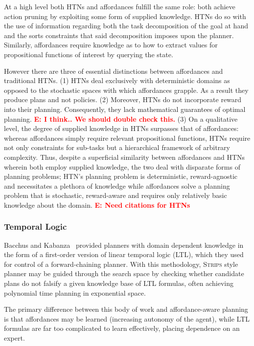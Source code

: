 \documentclass[conference]{IEEEtran}
\newcommand{\enote}[1]{\textcolor{Red}{\textbf{E: #1}}}
\begin{document}
At a high level both HTNs and affordances fulfill the same role: both achieve action pruning by exploiting some form of supplied knowledge. HTNs do so with the use of information regarding both the task decomposition of the goal at hand and the sorts constraints that said decomposition imposes upon the planner. Similarly, affordances require knowledge as to how to extract values for propositional functions of interest by querying the state.

However there are three of essential distinctions between affordances and traditional HTNs. (1) HTNs deal exclusively with deterministic domains as opposed to the stochastic spaces with which affordances grapple. As a result they produce plans and not policies. (2) Moreover, HTNs do not incorporate reward into their planning. Consequently, they lack mathematical guarantees of optimal planning. \enote{I think.. We should double check this.} (3) On a qualitative level, the degree of supplied knowledge in HTNs surpasses that of affordances: whereas affordances simply require relevant propositional functions, HTNs require not only constraints for sub-tasks but a hierarchical framework of arbitrary complexity. Thus, despite a superficial similarity between affordances and HTNs wherein both employ supplied knowledge, the two deal with disparate forms of planning problems; HTN's planning problem is deterministic, reward-agnostic and necessitates a plethora of knowledge while affordances solve a planning problem that is stochastic, reward-aware and requires only relatively basic knowledge about the domain.
\enote{Need citations for HTNs}

\subsubsection{Temporal Logic}

Bacchus and Kabanza~\cite{Bacchus95usingtemporal,Bacchus99usingtemporal} provided
planners with domain dependent knowledge in the form of a first-order version of linear
temporal logic (LTL), which they used for control of a forward-chaining planner. With this methodology, 
\textsc{Strips} style planner may be guided through the search space by checking 
whether candidate plans do not falsify a given knowledge base of LTL formulas, often
achieving polynomial time planning in exponential space.

The primary difference between this body of work and affordance-aware planning is that affordances may be learned (increasing autonomy of the agent), while LTL formulas are far too complicated to learn effectively, placing dependence on an expert.
\end{document}
